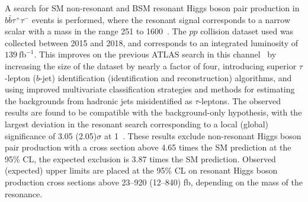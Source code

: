 A search for SM non-resonant and BSM resonant Higgs boson pair production in $b\bar b\tau^+\tau^-$ events is performed, where the resonant signal corresponds to a narrow scalar with a mass in the range 251 to 1600~\GeV. The $pp$ collision dataset used was collected between 2015 and 2018, and corresponds to an integrated luminosity of $139~\text{fb}^{-1}$. This improves on the previous ATLAS search in this channel~\cite{HIGG-2016-16} by increasing the size of the dataset by nearly a factor of four, introducing superior $\tau$-lepton ($b$-jet) identification (identification and reconstruction) algorithms, and using improved multivariate classification strategies and methods for estimating the backgrounds from hadronic jets misidentified as $\tau$-leptons. The observed results are found to be compatible with the background-only hypothesis, with the largest deviation in the resonant search corresponding to a local (global) significance of 3.05 (2.05)$\sigma$ at 1~\TeV. These results exclude non-resonant Higgs boson pair production with a cross section above 4.65 times the SM prediction at the 95\% CL, the expected exclusion is 3.87 times the SM prediction. Observed (expected) upper limits are placed at the 95\% CL on resonant Higgs boson production cross sections above 23--920 (12--840) fb, depending on the mass of the resonance. 
